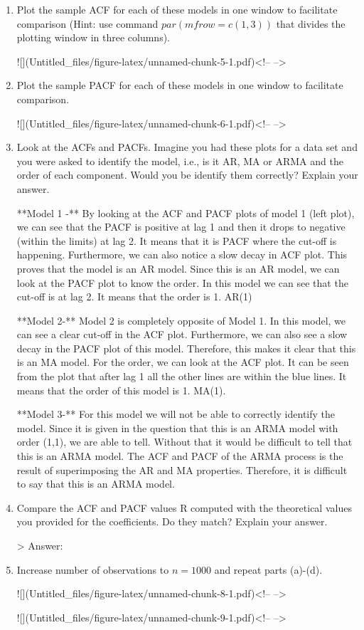 \documentclass[
]{article}
\begin{document}
\begin{enumerate}[label=(\alph*)]

\item Plot the sample ACF for each of these models in one window to facilitate comparison (Hint: use command $par(mfrow=c(1,3))$ that divides the plotting window in three columns).  

![](Untitled_files/figure-latex/unnamed-chunk-5-1.pdf)<!-- --> 


\item Plot the sample PACF for each of these models in one window to facilitate comparison.  

![](Untitled_files/figure-latex/unnamed-chunk-6-1.pdf)<!-- --> 

\item Look at the ACFs and PACFs. Imagine you had these plots for a data set and you were asked to identify the model, i.e., is it AR, MA or ARMA and the order of each component. Would you be identify them correctly? Explain your answer.

**Model 1 -** By looking at the ACF and PACF plots of model 1 (left plot), we can see that the PACF is positive at lag 1 and then it drops to negative (within the limits) at lag 2. It means that it is PACF where the cut-off is happening. Furthermore, we can also notice a slow decay in ACF plot. This proves that the model is an AR model. Since this is an AR model, we can look at the PACF plot to know the order. In this model we can see that the cut-off is at lag 2. It means that the order is 1. AR(1)

**Model 2-** Model 2 is completely opposite of Model 1. In this model, we can see a clear cut-off in the ACF plot. Furthermore, we can also see a slow decay in the PACF plot of this model. Therefore, this makes it clear that this is an MA model. For the order, we can look at the ACF plot. It can be seen from the plot that after lag 1 all the other lines are within the blue lines. It means that the order of this model is 1. MA(1).

**Model 3-** For this model we will not be able to correctly identify the model. Since it is given in the question that this is an ARMA model with order (1,1), we are able to tell. Without that it would be difficult to tell that this is an ARMA model. The ACF and PACF of the ARMA process is the result of superimposing the AR and MA properties. Therefore, it is difficult to say that this is an ARMA model.

\item Compare the ACF and PACF values R computed with the theoretical values you provided for the coefficients. Do they match? Explain your answer.

> Answer: 


\item Increase number of observations to $n=1000$ and repeat parts (a)-(d).



![](Untitled_files/figure-latex/unnamed-chunk-8-1.pdf)<!-- --> 

![](Untitled_files/figure-latex/unnamed-chunk-9-1.pdf)<!-- --> 

\end{enumerate}
\end{document}
